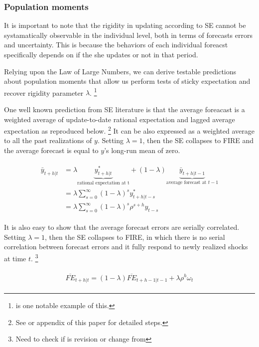 \documentclass[]{article}
\begin{document}
\subsubsection{Population moments} 
	
It is important to note that the rigidity in updating according to SE cannot be systamatically observable in the individual level, both in terms of forecasts errors and uncertainty. This is because the behaviors of each individual foreacst specifically depends on if the she updates or not in that period. 

Relying upon the Law of Large Numbers, we can derive testable predictions about population moments that allow us perform tests of sticky expectation and recover rigidity parameter $\lambda$. \footnote{\citet{carroll2003macroeconomic} is one notable example of this.} 
	

One well known prediction from SE literature is that the average foreacast is a weighted average of update-to-date rational expectation and lagged average expectation as reproduced below. \footnote{See \citet{coibion2012can} or appendix of this paper for detailed steps.} It can be also expressed as a weighted average to all the past realizations of $y$. Setting $\lambda=1$, then the SE collapses to FIRE and the average forecast is equal to $y$'s long-run mean of zero.

\begin{eqnarray}
\begin{aligned}
\bar y_{t+h|t} & = \lambda \underbrace{y^*_{t+h|t}}_{\textrm{rational expectation at t}} + (1-\lambda) \underbrace{\bar y_{t+h|t-1}}_{\textrm{average forecast at } t-1} \\
& = \lambda \sum^{\infty}_{s=0} (1-\lambda)^s y^*_{t+h|t-s} \\
& = \lambda \sum^{\infty}_{s=0} (1-\lambda)^s \rho^{s+h}y_{t-s}
\end{aligned}
\end{eqnarray}

It is also easy to show that the average forecast errors are serially correlated. Setting $\lambda=1$, then the SE collapses to FIRE, in which there is no serial correlation between forecast errors and it fully respond to newly realized shocks at time $t$.  \footnote{Need to check if is revision or change from}

\begin{eqnarray}
\begin{aligned}
\overline{FE}_{t+h|t}  = (1-\lambda) \overline {FE}_{t+h-1|t-1} + \lambda \rho^h \omega_t 
\end{aligned}
\end{eqnarray}
\end{document}
